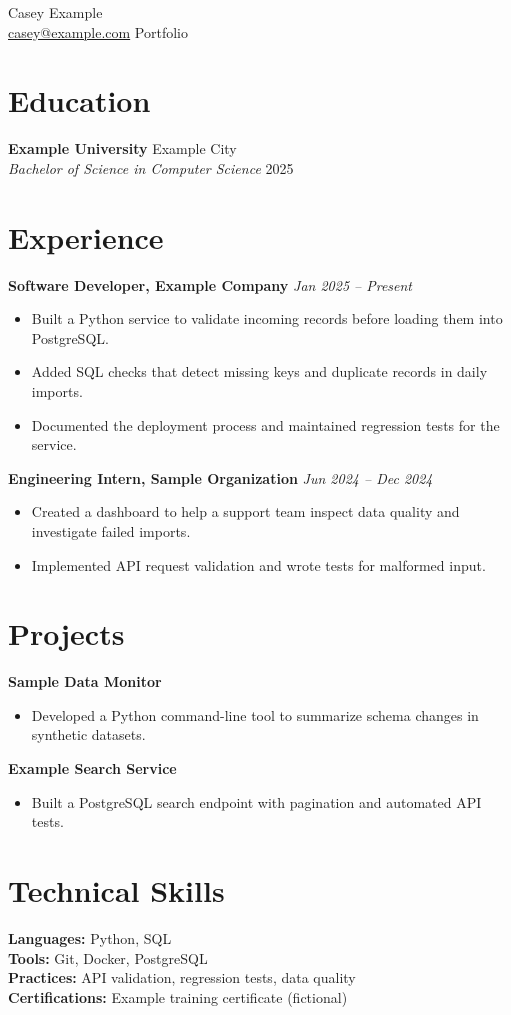 \documentclass[10pt,letterpaper]{article}
\begin{document}
\begin{center}
{\LARGE Casey Example}\\
\href{mailto:casey@example.com}{casey@example.com} \textbar{} Portfolio
\end{center}
\section{Education}
\textbf{Example University} \hfill Example City\\
\textit{Bachelor of Science in Computer Science} \hfill 2025
\section{Experience}
\textbf{Software Developer, Example Company} \hfill \textit{Jan 2025 -- Present}
\begin{itemize}
\item Built a Python service to validate incoming records before loading them into PostgreSQL.
\item Added SQL checks that detect missing keys and duplicate records in daily imports.
\item Documented the deployment process and maintained regression tests for the service.
\end{itemize}
\textbf{Engineering Intern, Sample Organization} \hfill \textit{Jun 2024 -- Dec 2024}
\begin{itemize}
\item Created a dashboard to help a support team inspect data quality and investigate failed imports.
\item Implemented API request validation and wrote tests for malformed input.
\end{itemize}
\section{Projects}
\textbf{Sample Data Monitor}
\begin{itemize}
\item Developed a Python command-line tool to summarize schema changes in synthetic datasets.
\end{itemize}
\textbf{Example Search Service}
\begin{itemize}
\item Built a PostgreSQL search endpoint with pagination and automated API tests.
\end{itemize}
\vfill
\section{Technical Skills}
\textbf{Languages:} Python, SQL\\
\textbf{Tools:} Git, Docker, PostgreSQL\\
\textbf{Practices:} API validation, regression tests, data quality\\
\textbf{Certifications:} Example training certificate (fictional)
\end{document}
